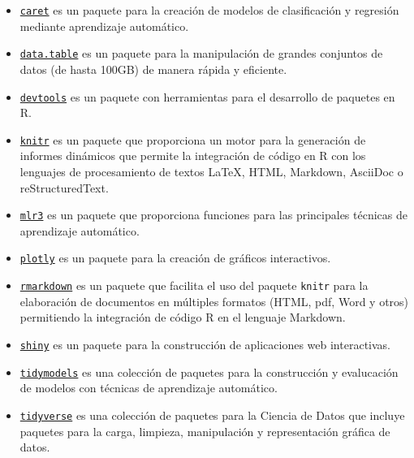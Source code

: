 \documentclass[
  a4paper,
]{scrreport}
\providecommand{\tightlist}{%
  \setlength{\itemsep}{0pt}\setlength{\parskip}{0pt}}\usepackage{longtable,booktabs,array}
\theoremstyle{definition}
\theoremstyle{definition}
\theoremstyle{remark}
\begin{document}
\begin{itemize}
\tightlist
\item
  \href{https://topepo.github.io/caret/index.html}{\texttt{caret}} es un
  paquete para la creación de modelos de clasificación y regresión
  mediante aprendizaje automático.
\item
  \href{https://www.rdocumentation.org/packages/data.table/}{\texttt{data.table}}
  es un paquete para la manipulación de grandes conjuntos de datos (de
  hasta 100GB) de manera rápida y eficiente.
\item
  \href{https://www.rdocumentation.org/packages/devtools/}{\texttt{devtools}}
  es un paquete con herramientas para el desarrollo de paquetes en R.
\item
  \href{https://www.r-project.org/nosvn/pandoc/knitr.html}{\texttt{knitr}}
  es un paquete que proporciona un motor para la generación de informes
  dinámicos que permite la integración de código en R con los lenguajes
  de procesamiento de textos LaTeX, HTML, Markdown, AsciiDoc o
  reStructuredText.
\item
  \href{https://mlr3.mlr-org.com/}{\texttt{mlr3}} es un paquete que
  proporciona funciones para las principales técnicas de aprendizaje
  automático.
\item
  \href{https://plotly.com/r/}{\texttt{plotly}} es un paquete para la
  creación de gráficos interactivos.
\item
  \href{https://rmarkdown.rstudio.com/}{\texttt{rmarkdown}} es un
  paquete que facilita el uso del paquete \texttt{knitr} para la
  elaboración de documentos en múltiples formatos (HTML, pdf, Word y
  otros) permitiendo la integración de código R en el lenguaje Markdown.
\item
  \href{https://shiny.rstudio.com/}{\texttt{shiny}} es un paquete para
  la construcción de aplicaciones web interactivas.
\item
  \href{https://www.tidymodels.org/}{\texttt{tidymodels}} es una
  colección de paquetes para la construcción y evalucación de modelos
  con técnicas de aprendizaje automático.
\item
  \href{https://www.tidyverse.org/}{\texttt{tidyverse}} es una colección
  de paquetes para la Ciencia de Datos que incluye paquetes para la
  carga, limpieza, manipulación y representación gráfica de datos.
\end{itemize}
\end{document}
